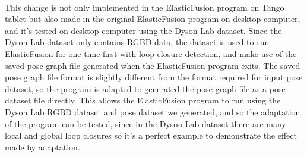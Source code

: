 \documentclass[12pt,twoside]{article}
\begin{document}
\\
This change is not only implemented in the ElasticFusion program on Tango tablet but also made in the original ElasticFusion program on desktop computer, and it's tested on desktop computer using the Dyson Lab dataset. Since the Dyson Lab dataset only contains RGBD data, the dataset is used to run ElasticFusion for one time first with loop closure detection, and make use of the saved pose graph file generated when the ElasticFusion program exits. The saved pose graph file format is slightly different from the format required for input pose dataset, so the program is adapted to generated the pose graph file as a pose dataset file directly. This allows the ElasticFusion program to run using the Dyson Lab RGBD dataset and pose dataset we generated, and so the adaptation of the program can be tested, since in the Dyson Lab dataset there are many local and global loop closures so it's a perfect example to demonstrate the effect made by adaptation.\\
\end{document}
